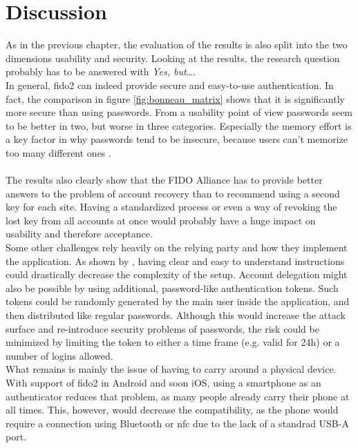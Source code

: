 
\section{Discussion}
\label{sec:discussion}

As in the previous chapter, the evaluation of the results is also split into the two dimensions usability and security.
Looking at the results, the research question probably has to be answered with \emph{Yes, but\dots}.\\
In general, \ac{fido2} can indeed provide secure and easy-to-use authentication. In fact, the comparison in figure \ref{fig:bonneau_matrix} shows that it is significantly more secure than using passwords. From a usability point of view passwords seem to be better in two, but worse in three categories. Especially the memory effort is a key factor in why passwords tend to be insecure, because users can't memorize too many different ones \cite{lyastani2018,elhai2016,whitty2015}.\\
\\
The results also clearly show that the FIDO Alliance has to provide better answers to the problem of account recovery than to recommend using a second key for each site. Having a standardized process or even a way of revoking the lost key from all accounts at once would probably have a huge impact on usability and therefore acceptance.\\
Some other challenges rely heavily on the relying party and how they implement the application. As shown by \cite{das2018}, having clear and easy to understand instructions could drastically decrease the complexity of the setup. Account delegation might also be possible by using additional, password-like authentication tokens. Such tokens could be randomly generated by the main user inside the application, and then distributed like regular passwords. Although this would increase the attack surface and re-introduce security problems of passwords, the risk could be minimized by limiting the token to either a time frame (e.g. valid for 24h) or a number of logins allowed.\\
What remains is mainly the issue of having to carry around a physical device. With support of \ac{fido2} in Android and soon iOS, using a smartphone as an authenticator reduces that problem, as many people already carry their phone at all times. This, however, would decrease the compatibility, as the phone would require a connection using Bluetooth or \ac{nfc} due to the lack of a standrad USB-A port.

